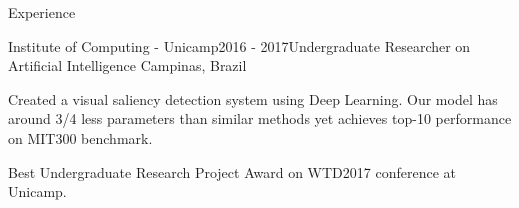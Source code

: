 \documentclass[8pt]{resume}
\begin{document}
\begin{rSection}{Experience}
\begin{rSubsection}{Institute of Computing - Unicamp}{2016 - 2017}{Undergraduate Researcher on Artificial Intelligence}
    {Campinas, Brazil}
    \item Created a visual saliency detection system using Deep Learning.
        Our model has around 3/4 less parameters than similar methods yet
        achieves top-10 performance on MIT300 benchmark.
    \item Best Undergraduate Research Project Award on WTD2017 conference at
        Unicamp.
\end{rSubsection}



\end{rSection}
\end{document}

